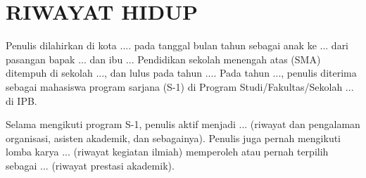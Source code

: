 
\chapter*{RIWAYAT HIDUP}

Penulis dilahirkan di kota .... pada tanggal bulan tahun sebagai anak ke ...
dari pasangan bapak ... dan ibu ...
Pendidikan sekolah menengah atas (SMA) ditempuh di sekolah ..., dan lulus pada
tahun ....
Pada tahun ..., penulis diterima sebagai mahasiswa program sarjana (S-1) di
Program Studi/Fakultas/Sekolah ... di IPB.

Selama mengikuti program S-1, penulis aktif menjadi ... (riwayat dan pengalaman
organisasi, asisten akademik, dan sebagainya).
Penulis juga pernah mengikuti lomba karya ... (riwayat kegiatan ilmiah)
memperoleh atau pernah terpilih sebagai ... (riwayat prestasi akademik).
